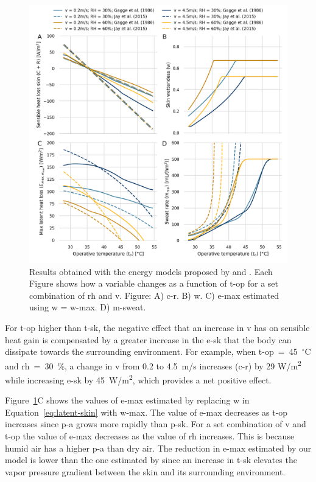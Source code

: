 \begin{figure}[thb!]
    \centering
    \includegraphics[width=\textwidth]{figures/comparison_models_v2}
    \caption{Results obtained with the energy models proposed by  and .
    Each Figure shows how a variable changes as a function of \ac{t-op} for a set combination of \ac{rh} and \ac{v}.
    Figure: A) \Acf{c-r}.
    B) \Acf{w}.
    C) \Acf{e-max} estimated using \ac{w} = \ac{w-max}.
    D) \Acf{m-sweat}.}
    \label{fig:comparison_models}
\end{figure}


For \ac{t-op} higher than \ac{t-sk}, the negative effect that an increase in \ac{v} has on sensible heat gain is compensated by a greater increase in the \acf{e-sk} that the body can dissipate towards the surrounding environment.
For example, when \ac{t-op}~=~45~$^{\circ}$C and \ac{rh}~=~30~\%, a change in \ac{v} from 0.2 to 4.5~m/s increases (\acs{c-r}) by 29 W/m\textsuperscript{2} while increasing \ac{e-sk} by 45~W/m\textsuperscript{2}, which provides a net positive effect.

Figure~\ref{fig:comparison_models}C shows the values of \ac{e-max} estimated by replacing \ac{w} in Equation~\ref{eq:latent-skin} with \ac{w-max}.
The value of \ac{e-max} decreases as \ac{t-op} increases since \ac{p-a} grows more rapidly than \ac{p-sk}.
For a set combination of \ac{v} and \ac{t-op} the value of \ac{e-max} decreases as the value of \ac{rh} increases.
This is because humid air has a higher \ac{p-a} than dry air.
The reduction in \ac{e-max} estimated by our model is lower than the one estimated by  since an increase in \ac{t-sk} elevates the vapor pressure gradient between the skin and its surrounding environment.

